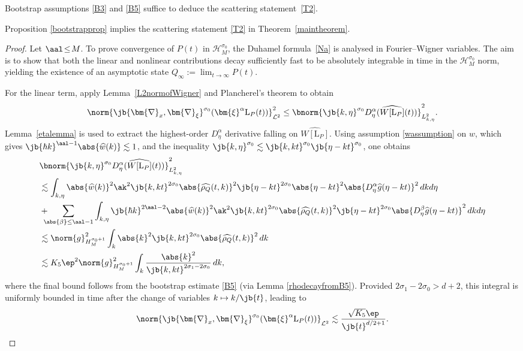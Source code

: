 Bootstrap assumptions \eqref{B3} and \eqref{B5} suffice to deduce the scattering statement~\eqref{T2}.
\begin{lemma}\label{scatteringlemma}
Proposition \ref{bootstrapprop} implies the scattering statement \eqref{T2} in Theorem~\ref{maintheorem}.
\end{lemma}
\begin{proof}Let $\aal\!\leq\! M$. To prove convergence of $P(t)$ in $\mathcal{H}^{\sigma_0}_M$, the Duhamel formula~\eqref{Na} is analysed in Fourier--Wigner variables. The aim is to show that both the linear and nonlinear contributions decay sufficiently fast to be absolutely integrable in time in the $\mathcal H^{\sigma_0}_M$ norm, yielding the existence of an asymptotic state $Q_\infty := \lim_{t \to \infty} P(t)$.

For the linear term, apply Lemma~\ref{L2normofWigner} and Plancherel's theorem to obtain
\begin{align*}
\norm{\jb{\bm{\nabla}_x,\bm{\nabla}_{\xi}}^{\sigma_0}(\bm{\xi}^\alpha {\mathrm{L}_P}(t))}^2_{\mathcal L^2} \leq \bnorm{\jb{k,\eta}^{\sigma_0} D^\alpha_\eta(\widehat{W[{\mathrm{L}_P}]}(t))}^2_{L^2_{k,\eta}}.
\end{align*}
Lemma~\ref{etalemma} is used to extract the highest-order $D^\alpha_\eta$ derivative falling on $\widehat{W[{\mathrm{L}_P}]}$. Using assumption \eqref{wassumption} on $w$, which gives $\jb{\hbar k}^{\aal - 1} \abs{\widehat{w}(k)} \lesssim 1$, and the inequality $\jb{k,\eta}^{\sigma_0} \lesssim \jb{k,kt}^{\sigma_0} \jb{\eta - kt}^{\sigma_0}$, one obtains
\begin{align*}
&\bnorm{\jb{k,\eta}^{\sigma_0} D^\alpha_\eta(\widehat{W[{\mathrm{L}_P}]}(t))}^2_{L^2_{k,\eta}} \\
&\lesssim \int_{k,\eta} \abs{\widehat{w}(k)}^2 \ak^2 \jb{k,kt}^{2\sigma_0} \abs{\widehat{\rho_Q}(t,k)}^2 \jb{\eta - kt}^{2\sigma_0} \abs{\eta - kt}^2 \abs{D^\alpha_\eta \widehat{g}(\eta - kt)}^2 \,dkd\eta \\
&+ \hspace{-0.25cm}\sum_{\abs{\beta} \leq \aal - 1} \int_{k,\eta} \jb{\hbar k}^{2\aal - 2} \abs{\widehat{w}(k)}^2 \ak^2 \jb{k,kt}^{2\sigma_0} \abs{\widehat{\rho_Q}(t,k)}^2\jb{\eta - kt}^{2\sigma_0} \abs{D^\beta_\eta \widehat{g}(\eta - kt)}^2 \,dkd\eta \\
&\lesssim \norm{g}_{H^{\sigma_0 + 1}_M}^2 \int_k \abs{k}^2 \jb{k,kt}^{2\sigma_0} \abs{\widehat{\rho_Q}(t,k)}^2 \,dk \\
&\lesssim K_5 \ep^2 \norm{g}_{H^{\sigma_0 + 1}_M}^2 \int_k \frac{\abs{k}^2}{\jb{k,kt}^{2\sigma_1 - 2\sigma_0}} \,dk,
\end{align*}
where the final bound follows from the bootstrap estimate \eqref{B5} (via Lemma \ref{rhodecayfromB5}). Provided $2\sigma_1-2\sigma_0>d+2$, this integral is uniformly bounded in time after the change of variables $k\mapsto k/\jb{t}$, leading to
\begin{align*}
\norm{\jb{\bm{\nabla}_x,\bm{\nabla}_{\xi}}^{\sigma_0}(\bm{\xi}^\alpha {\mathrm{L}_P}(t))}_{\mathcal L^2}\lesssim\frac{\sqrt{K_5}\ep}{\jb{t}^{d/2+1}}.
\end{align*}


\end{proof}
